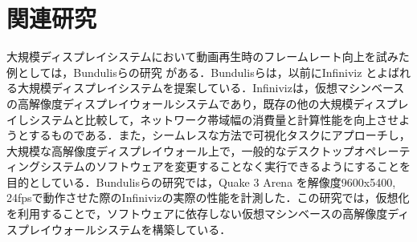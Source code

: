 \chapter{関連研究}

大規模ディスプレイシステムにおいて動画再生時のフレームレート向上を試みた例としては，Bundulisらの研究 \cite{bundulis2018infiniviz}がある．Bundulisらは，以前にInfiniviz \cite{bundulis2016infiniviz}とよばれる大規模ディスプレイシステムを提案している．Infinivizは，仮想マシンベースの高解像度ディスプレイウォールシステムであり，既存の他の大規模ディスプレイしシステムと比較して，ネットワーク帯域幅の消費量と計算性能を向上させようとするものである．また，シームレスな方法で可視化タスクにアプローチし，大規模な高解像度ディスプレイウォール上で，一般的なデスクトップオペレーティングシステムのソフトウェアを変更することなく実行できるようにすることを目的としている．Bundulisらの研究では，Quake 3 Arena \cite{quake3arena}を解像度9600x5400, 24fpsで動作させた際のInfinivizの実際の性能を計測した．この研究では，仮想化を利用することで，ソフトウェアに依存しない仮想マシンベースの高解像度ディスプレイウォールシステムを構築している．